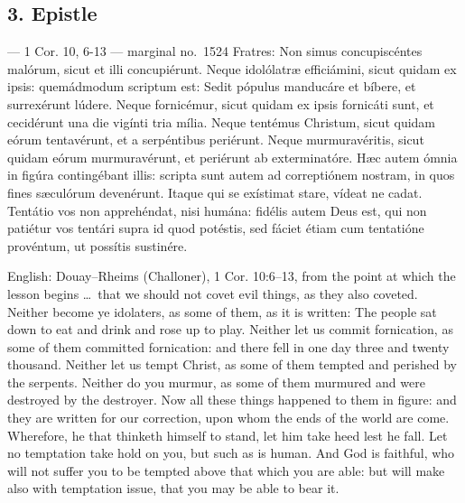 
\elementguard
\subsection*{3. Epistle }

\begin{appointedlatin}{ --- 1 Cor. 10, 6-13 --- marginal no.\ 1524}
Fratres: Non simus concupiscéntes malórum, sicut et illi concupiérunt. Neque
idolólatræ efficiámini, sicut quidam ex ipsis: quemádmodum scriptum est: Sedit
pópulus manducáre et bíbere, et surrexérunt lúdere. Neque fornicémur, sicut
quidam ex ipsis fornicáti sunt, et cecidérunt una die vigínti tria mília.
Neque tentémus Christum, sicut quidam eórum tentavérunt, et a serpéntibus
periérunt. Neque murmuravéritis, sicut quidam eórum murmuravérunt, et
periérunt ab exterminatóre. Hæc autem ómnia in figúra contingébant illis:
scripta sunt autem ad correptiónem nostram, in quos fines sæculórum
devenérunt. Itaque qui se exístimat stare, vídeat ne cadat. Tentátio vos non
apprehéndat, nisi humána: fidélis autem Deus est, qui non patiétur vos tentári
supra id quod potéstis, sed fáciet étiam cum tentatióne provéntum, ut possítis
sustinére.
\end{appointedlatin}

\begin{namedtranslation}{English: Douay--Rheims (Challoner), 1 Cor. 10:6--13, from the point at which the lesson begins}
\dots\ that we should not covet evil things, as they also coveted. Neither
become ye idolaters, as some of them, as it is written: The people sat down to
eat and drink and rose up to play. Neither let us commit fornication, as some
of them committed fornication: and there fell in one day three and twenty
thousand. Neither let us tempt Christ, as some of them tempted and perished by
the serpents. Neither do you murmur, as some of them murmured and were
destroyed by the destroyer. Now all these things happened to them in figure:
and they are written for our correction, upon whom the ends of the world are
come. Wherefore, he that thinketh himself to stand, let him take heed lest he
fall. Let no temptation take hold on you, but such as is human. And God is
faithful, who will not suffer you to be tempted above that which you are able:
but will make also with temptation issue, that you may be able to bear it.
\end{namedtranslation}

